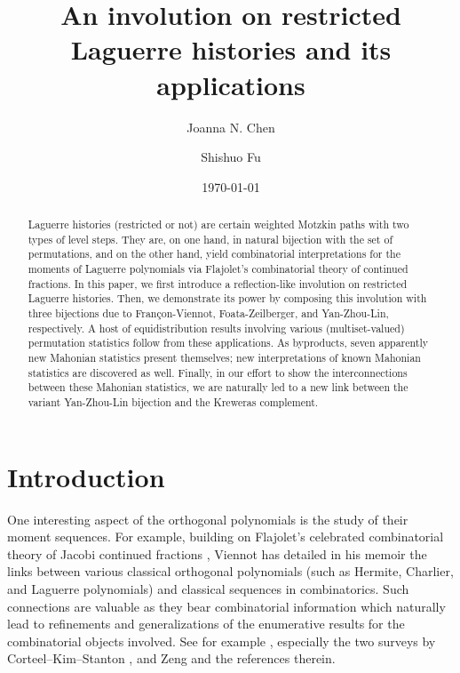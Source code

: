\documentclass[12pt]{amsart}
\numberwithin{equation}{section}
\theoremstyle{plain}
\theoremstyle{definition}
\begin{document}
\title[An involution on restricted Laguerre histories and its
applications]{An involution on restricted Laguerre histories and its
applications}

\author[J.~N.~Chen]{Joanna N. Chen}
\address{College of Science, Tianjin University of Technology, Tianjin 300384, P.R. China.}

\author[S.~Fu]{Shishuo Fu}
\address{College of Mathematics and Statistics, Chongqing University, Chongqing 401331, P.R. China.}

\date{\today}


\begin{abstract}
Laguerre histories (restricted or not) are certain weighted Motzkin paths with two types of level steps. They are, on one hand, in natural bijection with the set of permutations, and on the other hand, yield combinatorial interpretations for the moments of Laguerre polynomials via Flajolet's combinatorial theory of continued fractions. In this paper, we first introduce a reflection-like involution on restricted Laguerre histories. Then, we demonstrate its power by composing this involution with three bijections due to Fran\c con-Viennot,  Foata-Zeilberger, and Yan-Zhou-Lin, respectively. A host of equidistribution results involving various (multiset-valued) permutation statistics follow from these applications. As byproducts, seven apparently new Mahonian statistics present themselves; new interpretations of known Mahonian statistics are discovered as well. Finally, in our effort to show the interconnections between these Mahonian statistics, we are naturally led to a new link between the variant Yan-Zhou-Lin bijection and the Kreweras complement.
\end{abstract}

\keywords{}

\maketitle


\section{Introduction}\label{sec:intro}

One interesting aspect of the orthogonal polynomials is the study of their moment sequences. For example, building on Flajolet's celebrated combinatorial theory of Jacobi continued fractions \cite{Fla}, Viennot has detailed in his memoir \cite{Vie} the links between various classical orthogonal polynomials (such as Hermite, Charlier, and Laguerre polynomials) and classical sequences in combinatorics. Such connections are valuable as they bear combinatorial information which naturally lead to refinements and generalizations of the enumerative results for the combinatorial objects involved. See for example \cite{CSZ,Cor,FV,FZ90,SS,KZ,SZ12,YZL,HMZ}, especially the two surveys by Corteel--Kim--Stanton \cite{CKS}, and Zeng \cite{Zen} and the references therein.
\end{document}
